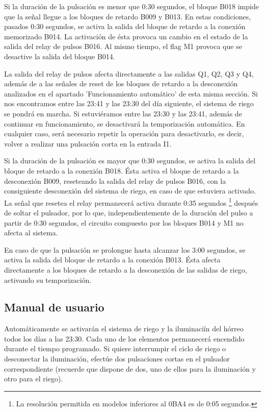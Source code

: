 Si la duraci\'on de la pulsaci\'on es menor que 0:30 segundos, el bloque B018 impide que la señal llegue a los bloques de retardo B009 y B013. En estas condiciones, pasados 0:30 segundos, se activa la salida del bloque de retardo a la conexi\'on memorizado B014. La activaci\'on de \'esta provoca un cambio en el estado de la salida del relay de pulsos B016. Al mismo tiempo, el flag M1 provoca que se desactive la salida del bloque B014.

La salida del relay de pulsos afecta directamente a las salidas Q1, Q2, Q3 y Q4, adem\'as de a las señales de reset de los bloques de retardo a la desconexi\'on analizados en el apartado 'Funcionamiento autom\'atico' de esta misma secci\'on. Si nos encontramos entre las 23:41 y las 23:30 del d\'ia siguiente, el sistema de riego se pondr\'a en marcha. Si estuvi\'eramos entre las 23:30 y las 23:41, adem\'as de continuar en funcionamiento, se desactivar\'a la temporizaci\'on autom\'atica. En cualquier caso, ser\'a necesario repetir la operaci\'on para desactivarlo, es decir, volver a realizar una pulsaci\'on corta en la entrada I1.

Si la duraci\'on de la pulsaci\'on es mayor que 0:30 segundos, se activa la salida del bloque de retardo a la conexi\'on B018. \'Esta activa el bloque de retardo a la desconexi\'on B009, reseteando la salida del relay de pulsos B016, con la consiguiente desconexi\'on del sistema de riego, en caso de que estuviera activado. La señal que resetea el relay permanecer\'a activa durante 0:35 segundos \footnote{\tiny{La resoluci\'on permitida en modelos inferiores al 0BA4 es de 0:05 segundos.}} despu\'es de soltar el pulsador, por lo que, independientemente de la duraci\'on del pulso a partir de 0:30 segundos, el circuito compuesto por los bloques B014 y M1 no afecta al sistema.

En caso de que la pulsaci\'on se prolongue hasta alcanzar los 3:00 segundos, se activa la salida del bloque de retardo a la conexi\'on B013. \'Esta afecta directamente a los bloques de retardo a la desconexi\'on de las salidas de riego, activando su temporizaci\'on.

\subsection{Manual de usuario}

Autom\'aticamente se activar\'an el sistema de riego y la iluminaci\'in del h\'orreo todos los d\'ias a las 23:30. Cada uno de los elementos permanecer\'a encendido durante el tiempo programado. Si quiere interrumpir el ciclo de riego o desconectar la iluminaci\'on, efect\'ue dos pulsaciones cortas en el pulsador correspondiente (recuerde que dispone de dos, uno de ellos para la iluminaci\'on y otro para el riego).

